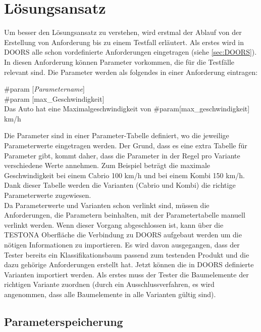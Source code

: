 \chapter{Lösungsansatz}\label{chp:loesungsansatz}

Um besser den Lösungsansatz zu verstehen, wird erstmal der Ablauf von der Erstellung von Anforderung bis zu einem Testfall erläutert. Als erstes wird in DOORS alle schon vordefinierte Anforderungen eingetragen (siehe \ref{sec:DOORS}). In diesen Anforderung können Parameter vorkommen, die für die Testfälle relevant sind. Die Parameter werden als folgendes in einer Anforderung eintragen:\\

\begin{center}
\#param [\textit{Parametername}]\\
\#param [max\_Geschwindigkeit]\\
Das Auto hat eine Maximalgeschwindigkeit von \#param[max\_geschwindigkeit] km/h
\end{center}

Die Parameter sind in einer Parameter-Tabelle definiert, wo die jeweilige Parameterwerte eingetragen werden. Der Grund, dass es eine extra Tabelle für Parameter gibt, kommt daher, dass die Parameter in der Regel pro Variante verschiedene Werte annehmen. Zum Beispiel beträgt die maximale Geschwindigkeit bei einem Cabrio 100 km/h  und bei einem Kombi 150 km/h. Dank dieser Tabelle werden die Varianten (Cabrio und Kombi) die richtige Parameterwerte zugewiesen.\\

Da Parameterwerte und Varianten schon verlinkt sind, müssen die Anforderungen, die Parametern beinhalten, mit der Parametertabelle manuell verlinkt werden. Wenn dieser Vorgang abgeschlossen ist, kann über die TESTONA Oberfläche die Verbindung zu DOORS aufgebaut werden um die nötigen Informationen zu importieren. Es wird davon ausgegangen, dass der Tester bereits ein Klassifikationsbaum passend zum testenden Produkt und die dazu gehörige Anforderungen erstellt hat. Jetzt können die in DOORS definierte Varianten importiert werden. Als erstes muss der Tester die Baumelemente der richtigen Variante zuordnen (durch ein Ausschlussverfahren, es wird angenommen, dass alle Baumelemente in alle Varianten gültig sind). 


\newpage
\section{Parameterspeicherung}\label{sec.parameterspeicherung}
